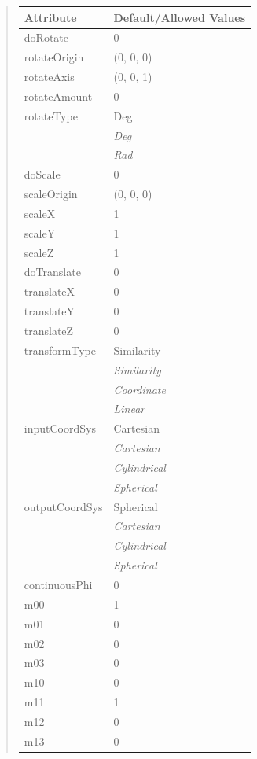 \documentclass[letterpaper,10pt,english]{sphinxmanual}
\begin{document}
\begin{quote}
\begin{longtable}{|l|l|}
\textbf{Attribute}
 & 
\textbf{Default/Allowed Values}
\\
\hline
doRotate
 & 
0
\\
\hline
rotateOrigin
 & 
(0, 0, 0)
\\
\hline
rotateAxis
 & 
(0, 0, 1)
\\
\hline
rotateAmount
 & 
0
\\
\hline
rotateType
 & 
Deg
\\
\hline & 
\emph{Deg}
\\
\hline & 
\emph{Rad}
\\
\hline
doScale
 & 
0
\\
\hline
scaleOrigin
 & 
(0, 0, 0)
\\
\hline
scaleX
 & 
1
\\
\hline
scaleY
 & 
1
\\
\hline
scaleZ
 & 
1
\\
\hline
doTranslate
 & 
0
\\
\hline
translateX
 & 
0
\\
\hline
translateY
 & 
0
\\
\hline
translateZ
 & 
0
\\
\hline
transformType
 & 
Similarity
\\
\hline & 
\emph{Similarity}
\\
\hline & 
\emph{Coordinate}
\\
\hline & 
\emph{Linear}
\\
\hline
inputCoordSys
 & 
Cartesian
\\
\hline & 
\emph{Cartesian}
\\
\hline & 
\emph{Cylindrical}
\\
\hline & 
\emph{Spherical}
\\
\hline
outputCoordSys
 & 
Spherical
\\
\hline & 
\emph{Cartesian}
\\
\hline & 
\emph{Cylindrical}
\\
\hline & 
\emph{Spherical}
\\
\hline
continuousPhi
 & 
0
\\
\hline
m00
 & 
1
\\
\hline
m01
 & 
0
\\
\hline
m02
 & 
0
\\
\hline
m03
 & 
0
\\
\hline
m10
 & 
0
\\
\hline
m11
 & 
1
\\
\hline
m12
 & 
0
\\
\hline
m13
 & 
0
\\
\hline

\end{longtable}
\end{quote}
\end{document}
